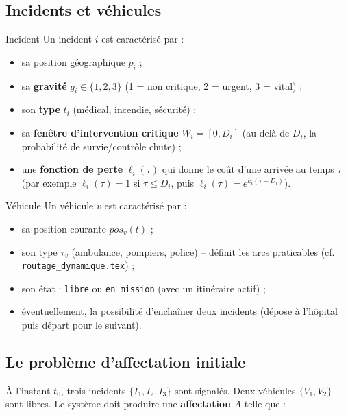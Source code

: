 \documentclass[12pt,a4paper]{article}
\theoremstyle{definition}
\theoremstyle{remark}
\begin{document}
\subsection{Incidents et véhicules}

\begin{defbox}{Incident}
Un incident $i$ est caractérisé par :
\begin{itemize}[leftmargin=1.5em]
  \item sa position géographique $p_i$ ;
  \item sa \textbf{gravité} $g_i \in \{1,2,3\}$ (1 = non critique,
        2 = urgent, 3 = vital) ;
  \item son \textbf{type} $t_i$ (médical, incendie, sécurité) ;
  \item sa \textbf{fenêtre d’intervention critique} $W_i = [0, D_i]$
        (au‑delà de $D_i$, la probabilité de survie/contrôle chute) ;
  \item une \textbf{fonction de perte} $\ell_i(\tau)$ qui donne le coût
        d’une arrivée au temps $\tau$ (par exemple $\ell_i(\tau)= 1$ si
        $\tau \leq D_i$, puis $\ell_i(\tau)= e^{k_i(\tau-D_i)}$).
\end{itemize}
\end{defbox}

\begin{defbox}{Véhicule}
Un véhicule $v$ est caractérisé par :
\begin{itemize}[leftmargin=1.5em]
  \item sa position courante $pos_v(t)$ ;
  \item son type $\tau_v$ (ambulance, pompiers, police) – définit les arcs
        praticables (cf. \texttt{routage\_dynamique.tex}) ;
  \item son état : \texttt{libre} ou \texttt{en mission} (avec un
        itinéraire actif) ;
  \item éventuellement, la possibilité d’enchaîner deux incidents
        (dépose à l’hôpital puis départ pour le suivant).
\end{itemize}
\end{defbox}

\subsection{Le problème d’affectation initiale}

À l’instant $t_0$, trois incidents $\{I_1,I_2,I_3\}$ sont signalés.
Deux véhicules $\{V_1,V_2\}$ sont libres. Le système doit produire
une \textbf{affectation} $A$ telle que :
\end{document}
